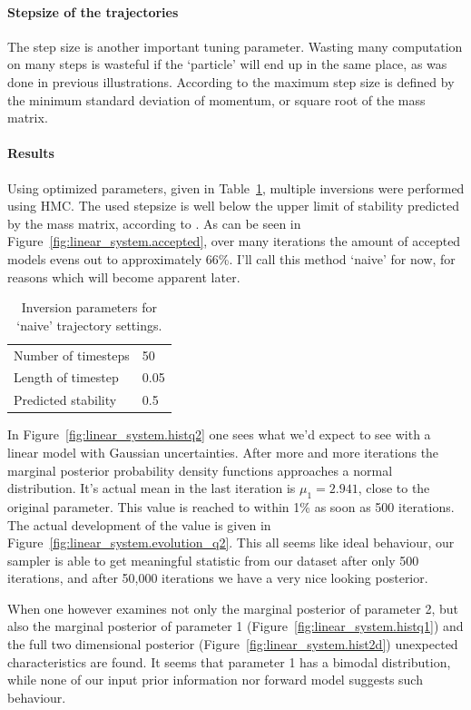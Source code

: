 \paragraph{Stepsize of the trajectories} The step size is another important tuning parameter. Wasting many computation on many steps is wasteful if the `particle' will end up in the same place, as was done in previous illustrations. According to \cite{neal2011mcmc} the maximum step size is defined by the minimum standard deviation of momentum, or square root of the mass matrix.

\paragraph{Results}
Using optimized parameters, given in Table~\ref{tab:naive_params}, multiple inversions were performed using \gls{HMC}. The used stepsize is well below the upper limit of stability predicted by the mass matrix, according to \cite{neal2011mcmc}. As can be seen in Figure~\ref{fig:linear_system.accepted}, over many iterations the amount of accepted models evens out to approximately 66\%. I'll call this method `naive' for now, for reasons which will become apparent later.

\begin{table}[]
\centering
\begin{tabular}{l|l}
 Number of timesteps & 50 \\
 Length of timestep & 0.05 \\
 Predicted stability &  0.5
\end{tabular}
\caption{Inversion parameters for `naive' trajectory settings.}
\label{tab:naive_params}
\end{table}

In Figure~\ref{fig:linear_system.histq2} one sees what we'd expect to see with a linear model with Gaussian uncertainties. After more and more iterations the marginal posterior probability density functions approaches a normal distribution. It's actual mean in the last iteration is $\mu_1 = 2.941$, close to the original parameter. This value is reached to within 1\% as soon as 500 iterations. The actual development of the value is given in Figure~\ref{fig:linear_system.evolution_q2}. This all seems like ideal behaviour, our sampler is able to get meaningful statistic from our dataset after only 500 iterations, and after 50,000 iterations we have a very nice looking posterior.

When one however examines not only the marginal posterior of parameter 2, but also the marginal posterior of parameter 1 (Figure~\ref{fig:linear_system.histq1}) and the full two dimensional posterior (Figure~\ref{fig:linear_system.hist2d}) unexpected characteristics are found. It seems that parameter 1 has a bimodal distribution, while none of our input prior information nor forward model suggests such behaviour.

